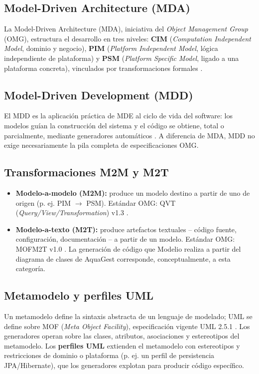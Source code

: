 \documentclass[11pt,a4paper]{article}
\begin{document}
\subsection{Model-Driven Architecture (MDA)}
\label{sec:mda}
La Model-Driven Architecture (MDA), iniciativa del \textit{Object Management
Group} (OMG), estructura el desarrollo en tres niveles: \textbf{CIM}
(\textit{Computation Independent Model}, dominio y negocio), \textbf{PIM}
(\textit{Platform Independent Model}, lógica independiente de plataforma) y
\textbf{PSM} (\textit{Platform Specific Model}, ligado a una plataforma
concreta), vinculados por transformaciones formales \cite{omg2014mda}.

\subsection{Model-Driven Development (MDD)}
El MDD es la aplicación práctica de MDE al ciclo de vida del software: los
modelos guían la construcción del sistema y el código se obtiene, total o
parcialmente, mediante generadores automáticos \cite{selic2003,brambilla2017}.
A diferencia de MDA, MDD no exige necesariamente la pila completa de
especificaciones OMG.

\subsection{Transformaciones M2M y M2T}
\begin{itemize}[leftmargin=1.5em,itemsep=0.2em]
    \item \textbf{Modelo-a-modelo (M2M):} produce un modelo destino a partir de
    uno de origen (p. ej. PIM $\rightarrow$ PSM). Estándar OMG: QVT
    (\textit{Query/View/Transformation}) v1.3 \cite{omg2016qvt}.
    \item \textbf{Modelo-a-texto (M2T):} produce artefactos textuales -- código
    fuente, configuración, documentación -- a partir de un modelo. Estándar
    OMG: MOFM2T v1.0 \cite{omg2008mofm2t}. La generación de código que Modelio
    realiza a partir del diagrama de clases de AquaGest corresponde,
    conceptualmente, a esta categoría.
\end{itemize}

\subsection{Metamodelo y perfiles UML}
Un metamodelo define la sintaxis abstracta de un lenguaje de modelado; UML se
define sobre MOF (\textit{Meta Object Facility}), especificación vigente UML
2.5.1 \cite{omg2017uml}. Los generadores operan sobre las clases, atributos,
asociaciones y estereotipos del metamodelo. Los \textbf{perfiles UML} extienden
el metamodelo con estereotipos y restricciones de dominio o plataforma (p. ej.
un perfil de persistencia JPA/Hibernate), que los generadores explotan para
producir código específico.
\end{document}

